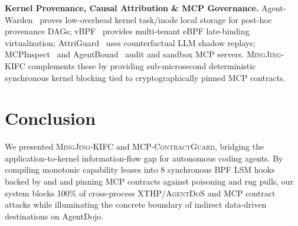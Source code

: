 \documentclass[10pt,twocolumn,letterpaper]{article}
\newcommand{\sys}{\textsc{MingJing-KIFC}}
\newcommand{\guard}{\textsc{MCP-ContractGuard}}
\begin{document}
\textbf{Kernel Provenance, Causal Attribution \& MCP Governance.} Agent-Warden~\cite{agentwarden2026} proves low-overhead kernel task/inode local storage for post-hoc provenance DAGs; vBPF~\cite{vbpf2026} provides multi-tenant eBPF late-binding virtualization; AttriGuard~\cite{attriguard2026} uses counterfactual LLM shadow replays; MCPInspect~\cite{mcpinspect2026} and AgentBound~\cite{agentbound2026} audit and sandbox MCP servers. \sys{} complements these by providing sub-microsecond deterministic synchronous kernel blocking tied to cryptographically pinned MCP contracts.

\section{Conclusion}

We presented \sys{} and \guard{}, bridging the application-to-kernel information-flow gap for autonomous coding agents. By compiling monotonic capability leases into 8 synchronous BPF LSM hooks backed by  and  and pinning MCP contracts against poisoning and rug pulls, our system blocks 100\% of cross-process XTHP/\textsc{AgentDoS} and MCP contract attacks while illuminating the concrete boundary of indirect data-driven destinations on AgentDojo.
\end{document}
